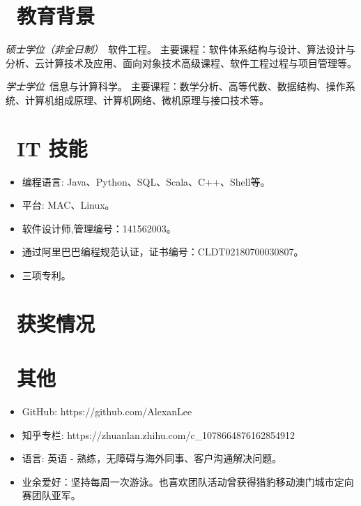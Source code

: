 \documentclass{resume}
\begin{document}
\section{\faGraduationCap\  教育背景}
\textit{硕士学位（非全日制）}\ 软件工程。
 主要课程：软件体系结构与设计、算法设计与分析、云计算技术及应用、面向对象技术高级课程、软件工程过程与项目管理等。

\textit{学士学位}\ 信息与计算科学。
 主要课程：数学分析、高等代数、数据结构、操作系统、计算机组成原理、计算机网络、微机原理与接口技术等。



\section{\faCogs\ IT 技能}
\begin{itemize}[parsep=0.5ex]
  \item 编程语言: Java、Python、SQL、Scala、C++、Shell等。
  \item 平台: MAC、Linux。
  \item 软件设计师,管理编号：141562003。
  \item 通过阿里巴巴编程规范认证，证书编号：CLDT02180700030807。
  \item 三项专利。
\end{itemize}

\section{\faHeartO\ 获奖情况}

\section{\faInfo\ 其他}
\begin{itemize}[parsep=0.5ex]
  \item GitHub: https://github.com/AlexanLee
  \item 知乎专栏: https://zhuanlan.zhihu.com/c\_1078664876162854912
  \item 语言: 英语 - 熟练，无障碍与海外同事、客户沟通解决问题。
  \item 业余爱好：坚持每周一次游泳。也喜欢团队活动曾获得猎豹移动澳门城市定向赛团队亚军。
\end{itemize}

%
%
\end{document}
